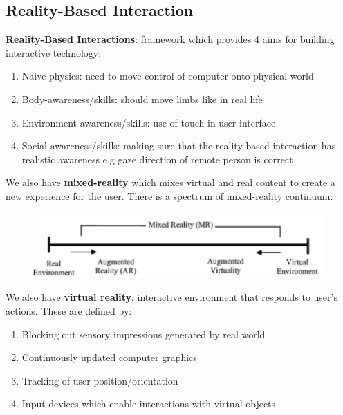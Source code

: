 \documentclass{article}
\begin{document}
\subsection{Reality-Based Interaction}
\textbf{Reality-Based Interactions}: framework which provides 4 aims for building interactive technology:
\begin{enumerate}
    \item Naive physics: need to move control of computer onto physical world
    \item Body-awareness/skills: should move limbs like in real life
    \item Environment-awareness/skills: use of touch in user interface
    \item Social-awareness/skills: making sure that the reality-based interaction has realistic awareness e.g gaze direction of remote person is correct
\end{enumerate}
We also have \textbf{mixed-reality} which mixes virtual and real content to create a new experience for the user. There is a spectrum of mixed-reality continuum:
\begin{figure}[H]
    \centering
    \includegraphics[width=0.5\linewidth]{Pictures/Screenshot 2023-03-04 at 19.07.43.png}
\end{figure}
We also have \textbf{virtual reality}: interactive environment that responds to user's actions. These are defined by:
\begin{enumerate}
    \item Blocking out sensory impressions generated by real world
    \item Continuously updated computer graphics
    \item Tracking of user position/orientation
    \item Input devices which enable interactions with virtual objects
\end{enumerate}
\end{document}
